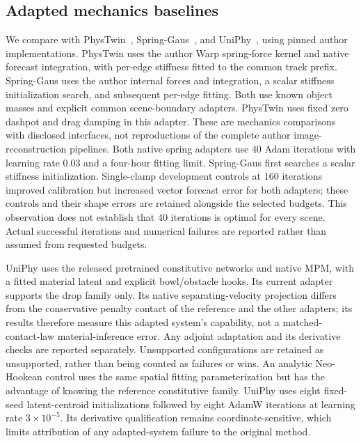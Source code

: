 \subsection{Adapted mechanics baselines}
We compare with PhysTwin~\cite{jiang2025phystwin},
Spring-Gaus~\cite{zhong2024springgaus}, and
UniPhy~\cite{mittal2025uniphy}, using pinned author implementations.
PhysTwin uses the author Warp spring-force kernel and native forecast
integration, with per-edge stiffness fitted to the common track prefix.
Spring-Gaus uses the author internal forces and integration, a scalar
stiffness initialization search, and subsequent per-edge fitting. Both use
known object masses and explicit common scene-boundary adapters. PhysTwin
uses fixed zero dashpot and drag damping in this adapter. These are
mechanics comparisons with disclosed interfaces, not reproductions of the
complete author image-reconstruction pipelines.
Both native spring adapters use $40$ Adam iterations with learning rate
$0.03$ and a four-hour fitting limit. Spring-Gaus first searches a scalar
stiffness initialization. Single-clamp development controls at $160$
iterations improved calibration but increased vector forecast error for
both adapters; these controls and their shape errors are retained alongside
the selected budgets. This observation does not establish that $40$
iterations is optimal for every scene. Actual successful iterations and
numerical failures are reported rather than assumed from requested budgets.

UniPhy uses the released pretrained constitutive networks and native MPM,
with a fitted material latent and explicit bowl/obstacle hooks. Its current
adapter supports the drop family only. Its native separating-velocity
projection differs from the conservative penalty contact of the reference
and the other adapters; its results therefore measure this adapted
system's capability, not a matched-contact-law material-inference error.
Any adjoint adaptation and its derivative checks are reported separately.
Unsupported configurations are retained as unsupported, rather than being
counted as failures or wins. An analytic Neo-Hookean control uses the same
spatial fitting parameterization but has the advantage of knowing the
reference constitutive family.
UniPhy uses eight fixed-seed latent-centroid initializations followed by
eight AdamW iterations at learning rate $3\times10^{-5}$. Its derivative
qualification remains coordinate-sensitive, which limits attribution of
any adapted-system failure to the original method.

